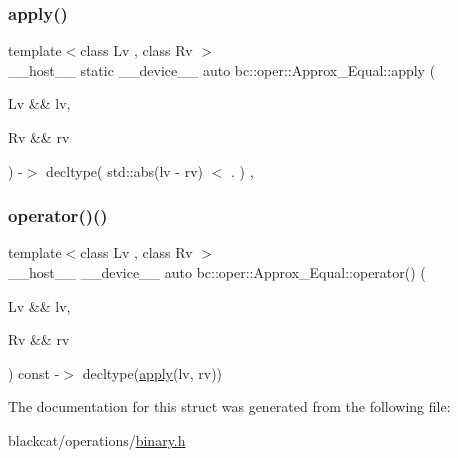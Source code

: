 \subsubsection{\texorpdfstring{apply()}{apply()}}
{\footnotesize\ttfamily template$<$class Lv , class Rv $>$ \\
\+\_\+\+\_\+host\+\_\+\+\_\+ static \+\_\+\+\_\+device\+\_\+\+\_\+ auto bc\+::oper\+::\+Approx\+\_\+\+Equal\+::apply (\begin{DoxyParamCaption}\item[{Lv \&\&}]{lv,  }\item[{Rv \&\&}]{rv }\end{DoxyParamCaption}) -\/$>$ decltype( std\+::abs(lv -\/ rv) $<$ . ) \hspace{0.3cm}{\ttfamily [inline]}, {\ttfamily [static]}}

\mbox{\label{structbc_1_1oper_1_1Approx__Equal_ad46ea264a8158c151ae0d159a3d0ed52}} 
\subsubsection{\texorpdfstring{operator()()}{operator()()}}
{\footnotesize\ttfamily template$<$class Lv , class Rv $>$ \\
\+\_\+\+\_\+host\+\_\+\+\_\+ \+\_\+\+\_\+device\+\_\+\+\_\+ auto bc\+::oper\+::\+Approx\+\_\+\+Equal\+::operator() (\begin{DoxyParamCaption}\item[{Lv \&\&}]{lv,  }\item[{Rv \&\&}]{rv }\end{DoxyParamCaption}) const -\/$>$ decltype(\hyperlink{structbc_1_1oper_1_1Approx__Equal_a7eaf517f3b69b5171d7bc4cc863cfd9c}{apply}(lv, rv)) \hspace{0.3cm}{\ttfamily [inline]}}



The documentation for this struct was generated from the following file\+:\begin{DoxyCompactItemize}
\item 
blackcat/operations/\hyperlink{binary_8h}{binary.\+h}\end{DoxyCompactItemize}
